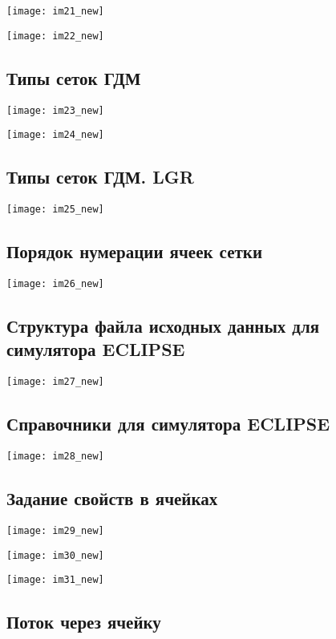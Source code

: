 \documentclass[main.tex]{subfiles}
\begin{document}
\texttt{[image: im21\_new]}

\texttt{[image: im22\_new]}

\subsection{Типы сеток ГДМ}

\texttt{[image: im23\_new]}

\texttt{[image: im24\_new]}

\subsection{Типы сеток ГДМ. LGR}

\texttt{[image: im25\_new]}

\subsection{Порядок нумерации ячеек сетки}

\texttt{[image: im26\_new]}

\subsection{Структура файла исходных данных для симулятора ECLIPSE}

\texttt{[image: im27\_new]}

\subsection{Справочники для симулятора ECLIPSE}

\texttt{[image: im28\_new]}

\subsection{Задание свойств в ячейках}

\texttt{[image: im29\_new]}

\texttt{[image: im30\_new]}

\texttt{[image: im31\_new]}

\subsection{Поток через ячейку}
\end{document}
